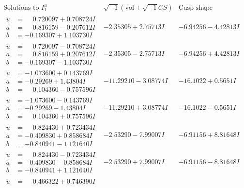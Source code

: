 \documentclass[1p]{elsarticle_modified}
\theoremstyle{definition}
\newcommand{\I}{\sqrt{-1}}
\begin{document}
$$\begin{array}{c|c|c}  
\text{Solutions to }I^u_{1}& \I (\text{vol} + \sqrt{-1}CS) & \text{Cusp shape}\\
 \hline 
\begin{aligned}
u &= \phantom{-}0.720097 + 0.708724 I \\
a &= \phantom{-}0.816159 - 0.207612 I \\
b &= -0.169307 + 1.103730 I\end{aligned}
 & -2.35305 + 2.75713 I & -6.94256 - 4.42813 I \\ \hline\begin{aligned}
u &= \phantom{-}0.720097 - 0.708724 I \\
a &= \phantom{-}0.816159 + 0.207612 I \\
b &= -0.169307 - 1.103730 I\end{aligned}
 & -2.35305 - 2.75713 I & -6.94256 + 4.42813 I \\ \hline\begin{aligned}
u &= -1.073600 + 0.143769 I \\
a &= -0.29269 + 1.43804 I \\
b &= \phantom{-}0.104360 - 0.757596 I\end{aligned}
 & -11.29210 - 3.08774 I & -16.1022 + 0.5651 I \\ \hline\begin{aligned}
u &= -1.073600 - 0.143769 I \\
a &= -0.29269 - 1.43804 I \\
b &= \phantom{-}0.104360 + 0.757596 I\end{aligned}
 & -11.29210 + 3.08774 I & -16.1022 - 0.5651 I \\ \hline\begin{aligned}
u &= \phantom{-}0.824430 + 0.723434 I \\
a &= -0.409830 + 0.858684 I \\
b &= -0.840941 - 1.121640 I\end{aligned}
 & -2.53290 - 7.99007 I & -6.91156 + 8.81648 I \\ \hline\begin{aligned}
u &= \phantom{-}0.824430 - 0.723434 I \\
a &= -0.409830 - 0.858684 I \\
b &= -0.840941 + 1.121640 I\end{aligned}
 & -2.53290 + 7.99007 I & -6.91156 - 8.81648 I \\ \hline\begin{aligned}
u &= \phantom{-}0.466322 + 0.746390 I \\

\end{aligned}
\end{array}$$
\end{document}

